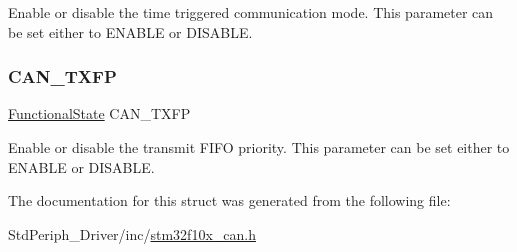 Enable or disable the time triggered communication mode. This parameter can be set either to E\+N\+A\+B\+LE or D\+I\+S\+A\+B\+LE. \mbox{\label{struct_c_a_n___init_type_def_a8f9c54b9a3f5663b482247a23d9cbf20}} 
\subsubsection{\texorpdfstring{CAN\_TXFP}{CAN\_TXFP}}
{\footnotesize\ttfamily \mbox{\hyperlink{group___exported__types_gac9a7e9a35d2513ec15c3b537aaa4fba1}{Functional\+State}} C\+A\+N\+\_\+\+T\+X\+FP}

Enable or disable the transmit F\+I\+FO priority. This parameter can be set either to E\+N\+A\+B\+LE or D\+I\+S\+A\+B\+LE. 

The documentation for this struct was generated from the following file\+:\begin{DoxyCompactItemize}
\item 
Std\+Periph\+\_\+\+Driver/inc/\mbox{\hyperlink{stm32f10x__can_8h}{stm32f10x\+\_\+can.\+h}}\end{DoxyCompactItemize}
